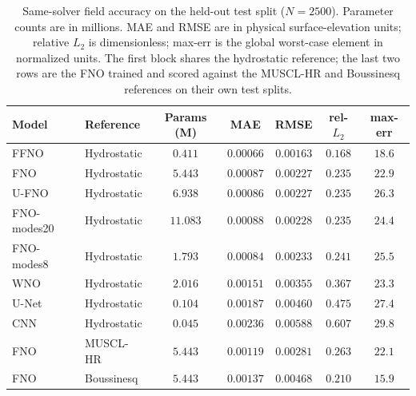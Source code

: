 \begin{table}[H]
\centering
\caption{Same-solver field accuracy on the held-out test split ($N = 2500$). Parameter counts are in millions. MAE and RMSE are in physical surface-elevation units; relative $L_2$ is dimensionless; max-err is the global worst-case element in normalized units. The first block shares the hydrostatic reference; the last two rows are the FNO trained and scored against the MUSCL-HR and Boussinesq references on their own test splits.}
\label{tab:accuracy}
\begin{tabular}{llccccc}
    \toprule
    Model & Reference & Params (M) & MAE & RMSE & rel-$L_2$ & max-err \\
    \midrule
    FFNO        & Hydrostatic & $0.411$  & $0.00066$ & $0.00163$ & $\mathbf{0.168}$ & $18.6$ \\
    FNO         & Hydrostatic & $5.443$  & $0.00087$ & $0.00227$ & $0.235$          & $22.9$ \\
    U-FNO       & Hydrostatic & $6.938$  & $0.00086$ & $0.00227$ & $0.235$          & $26.3$ \\
    FNO-modes20 & Hydrostatic & $11.083$ & $0.00088$ & $0.00228$ & $0.235$          & $24.4$ \\
    FNO-modes8  & Hydrostatic & $1.793$  & $0.00084$ & $0.00233$ & $0.241$          & $25.5$ \\
    WNO         & Hydrostatic & $2.016$  & $0.00151$ & $0.00355$ & $0.367$          & $23.3$ \\
    U-Net       & Hydrostatic & $0.104$  & $0.00187$ & $0.00460$ & $0.475$          & $27.4$ \\
    CNN         & Hydrostatic & $0.045$  & $0.00236$ & $0.00588$ & $0.607$          & $29.8$ \\
    \midrule
    FNO         & MUSCL-HR    & $5.443$  & $0.00119$ & $0.00281$ & $0.263$          & $22.1$ \\
    FNO         & Boussinesq  & $5.443$  & $0.00137$ & $0.00468$ & $0.210$          & $15.9$ \\
    \bottomrule
\end{tabular}
\end{table}

